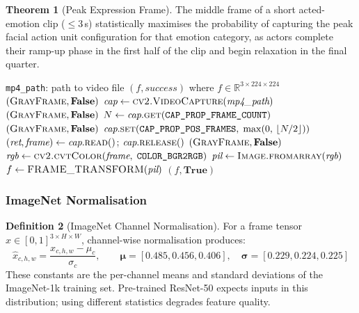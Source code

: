 \documentclass[12pt,a4paper]{article}
\theoremstyle{definition}
\newtheorem{theorem}{Theorem}[section]
\newtheorem{definition}[theorem]{Definition}
\theoremstyle{remark}
\begin{document}
\begin{theorem}[Peak Expression Frame]
The middle frame of a short acted-emotion clip ($\leq 3$\,s) statistically
maximises the probability of capturing the peak facial action unit configuration
for that emotion category, as actors complete their ramp-up phase in the first
half of the clip and begin relaxation in the final quarter.
\end{theorem}

\begin{algorithm}[H]
\caption{Middle-Frame Extraction from .mp4}
\label{alg:frame_extract}
\begin{algorithmic}[1]
\Require \texttt{mp4\_path}: path to video file
\Ensure $(f, \textit{success})$ where $f \in \mathbb{R}^{3 \times 224 \times 224}$
  \State \Return $(\textsc{GrayFrame}, \textbf{False})$ 
\EndIf
\State $\textit{cap} \gets \textsc{cv2.VideoCapture}(\textit{mp4\_path})$
  \State \Return $(\textsc{GrayFrame}, \textbf{False})$
\EndIf
\State $N \gets \textit{cap}.\textsc{get}(\texttt{CAP\_PROP\_FRAME\_COUNT})$
  \State \Return $(\textsc{GrayFrame}, \textbf{False})$
\EndIf
\State $\textit{cap}.\textsc{set}(\texttt{CAP\_PROP\_POS\_FRAMES},\; \max(0,\, \lfloor N/2 \rfloor))$
\State $(\textit{ret}, \textit{frame}) \gets \textit{cap}.\textsc{read}()$; \quad $\textit{cap}.\textsc{release}()$
  \State \Return $(\textsc{GrayFrame}, \textbf{False})$
\EndIf
\State $\textit{rgb} \gets \textsc{cv2.cvtColor}(\textit{frame},\; \texttt{COLOR\_BGR2RGB})$
\State $\textit{pil} \gets \textsc{Image.fromarray}(\textit{rgb})$
\State $f \gets \textsc{FRAME\_TRANSFORM}(\textit{pil})$
\State \Return $(f, \textbf{True})$
\end{algorithmic}
\end{algorithm}

\subsubsection{ImageNet Normalisation}

\begin{definition}[ImageNet Channel Normalisation]
For a frame tensor $x \in [0,1]^{3 \times H \times W}$, channel-wise
normalisation produces:
\[
  \hat{x}_{c,h,w} = \frac{x_{c,h,w} - \mu_c}{\sigma_c}, \qquad
  \boldsymbol{\mu} = [0.485, 0.456, 0.406], \quad
  \boldsymbol{\sigma} = [0.229, 0.224, 0.225]
\]
These constants are the per-channel means and standard deviations of the
ImageNet-1k training set. Pre-trained ResNet-50 expects inputs in this
distribution; using different statistics degrades feature quality.
\end{definition}
\end{document}
